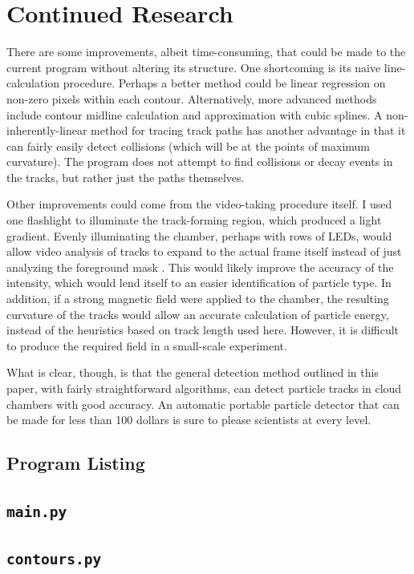 \documentclass[notitlepage,12pt]{article}
\newcommand{\mycite}[1]{\cite{#1}}
\begin{document}
\section{Continued Research}

There are some improvements, albeit time-consuming, that could be made to the current program without altering its structure.  One shortcoming is its naive line-calculation procedure.  Perhaps a better method could be linear regression on non-zero pixels within each contour.  Alternatively, more advanced methods include contour midline calculation and approximation with cubic splines.  A non-inherently-linear method for tracing track paths has another advantage in that it can fairly easily detect collisions (which will be at the points of maximum curvature).  The program does not attempt to find collisions or decay events in the tracks, but rather just the paths themselves. 
 
Other improvements could come from the video-taking procedure itself.  I used one flashlight to illuminate the track-forming region, which produced a light gradient.  Evenly illuminating the chamber, perhaps with rows of LEDs, would allow video analysis of tracks to expand to the actual frame itself instead of just analyzing the foreground mask \mycite{wayne}.  This would likely improve the accuracy of the intensity, which would lend itself to an easier identification of particle type.  In addition, if a strong magnetic field were applied to the chamber, the resulting curvature of the tracks would allow an accurate calculation of particle energy, instead of the heuristics based on track length used here.   However, it is difficult to produce the required field in a small-scale experiment.

What is clear, though, is that the general detection method outlined in this paper, with fairly straightforward algorithms, can detect particle tracks in cloud chambers with good accuracy.  An automatic portable particle detector that can be made for less than 100 dollars is sure to please scientists at every level.

\begin{appendices}

\clearpage

\section{Program Listing}
\subsection{\texttt{main.py}}


\clearpage

\subsection{\texttt{contours.py}}


\clearpage





\end{appendices}
\end{document}
